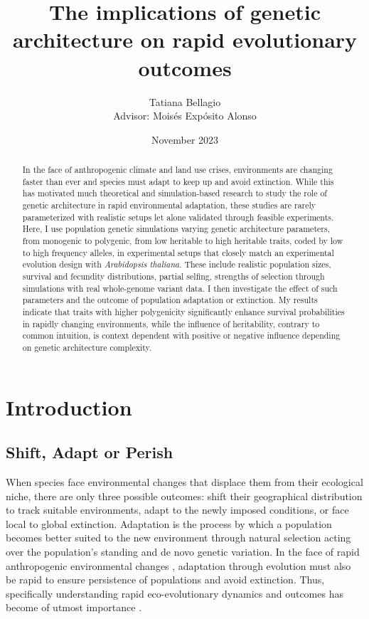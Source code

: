 \documentclass{article}
\title{The implications of genetic architecture on rapid evolutionary outcomes} %
\author{Tatiana Bellagio \\ Advisor: Moisés Expósito Alonso}
\date{November 2023}
\begin{document}
\maketitle

\begin{abstract}
In the face of anthropogenic climate and land use crises, environments are changing faster than ever and species must adapt to keep up and avoid extinction. While this has motivated much theoretical and simulation-based research to study the role of genetic architecture in rapid environmental adaptation, these studies are rarely parameterized with realistic setups let alone validated through feasible experiments. Here, I use population genetic simulations varying genetic architecture parameters, from monogenic to polygenic, from low heritable to high heritable traits, coded by low to high frequency alleles, in experimental setups that closely match an experimental evolution design with \textit{Arabidopsis thaliana}. These include realistic population sizes, survival and fecundity distributions, partial selfing, strengths of selection through simulations with real whole-genome variant data. I then investigate the effect of such parameters and the outcome of population adaptation or extinction. My results indicate that traits with higher polygenicity significantly enhance survival probabilities in rapidly changing environments, while the influence of heritability, contrary to common intuition, is context dependent with positive or negative influence depending on genetic architecture complexity.
\end{abstract}

\tableofcontents
\newpage %

\section{Introduction}
\subsection{Shift, Adapt or Perish}
When species face environmental changes that displace them from their ecological niche, there are only three possible outcomes: shift their geographical distribution to track suitable environments, adapt to the newly imposed conditions, or face local to global extinction. Adaptation is the process by which a population becomes better suited to the new environment through natural selection acting over the population's standing and de novo genetic variation. In the face of rapid anthropogenic environmental changes \citep{IPCC2023}, adaptation through evolution must also be rapid to ensure persistence of populations and avoid extinction. Thus, specifically understanding rapid eco-evolutionary dynamics and outcomes has become of utmost importance \citep{Waldvogel2020-dh, Palumbi2002-li, Stockwell2003-da}. 
\end{document}
